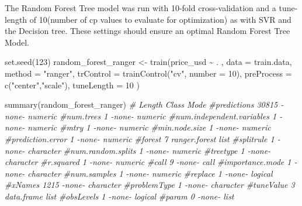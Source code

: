 \documentclass[
]{article}
\newenvironment{Shaded}{\begin{snugshade}}{\end{snugshade}}
\newcommand{\AttributeTok}[1]{\textcolor[rgb]{0.77,0.63,0.00}{#1}}
\newcommand{\CommentTok}[1]{\textcolor[rgb]{0.56,0.35,0.01}{\textit{#1}}}
\newcommand{\DecValTok}[1]{\textcolor[rgb]{0.00,0.00,0.81}{#1}}
\newcommand{\FunctionTok}[1]{\textcolor[rgb]{0.00,0.00,0.00}{#1}}
\newcommand{\NormalTok}[1]{#1}
\newcommand{\OtherTok}[1]{\textcolor[rgb]{0.56,0.35,0.01}{#1}}
\newcommand{\SpecialCharTok}[1]{\textcolor[rgb]{0.00,0.00,0.00}{#1}}
\newcommand{\StringTok}[1]{\textcolor[rgb]{0.31,0.60,0.02}{#1}}
\begin{document}
The Random Forest Tree model was run with 10-fold cross-validation and a
tune-length of 10(number of cp values to evaluate for optimization) as
with SVR and the Decision tree. These settings should ensure an optimal
Random Forest Tree Model.

\begin{Shaded}
\begin{Highlighting}[]
\FunctionTok{set.seed}\NormalTok{(}\DecValTok{123}\NormalTok{)}
\NormalTok{random\_forest\_ranger }\OtherTok{\textless{}{-}} \FunctionTok{train}\NormalTok{(price\_usd }\SpecialCharTok{\textasciitilde{}}\NormalTok{ . ,}
                              \AttributeTok{data =}\NormalTok{ train.data,}
                              \AttributeTok{method =} \StringTok{"ranger"}\NormalTok{,}
                              \AttributeTok{trControl =} \FunctionTok{trainControl}\NormalTok{(}\StringTok{"cv"}\NormalTok{, }\AttributeTok{number =} \DecValTok{10}\NormalTok{),}
                              \AttributeTok{preProcess =} \FunctionTok{c}\NormalTok{(}\StringTok{"center"}\NormalTok{,}\StringTok{"scale"}\NormalTok{),}
                              \AttributeTok{tuneLength =} \DecValTok{10}
\NormalTok{)}

\FunctionTok{summary}\NormalTok{(random\_forest\_ranger)}
\CommentTok{\#                          Length Class         Mode     }
\CommentTok{\#predictions               30815  {-}none{-}        numeric  }
\CommentTok{\#num.trees                     1  {-}none{-}        numeric  }
\CommentTok{\#num.independent.variables     1  {-}none{-}        numeric  }
\CommentTok{\#mtry                          1  {-}none{-}        numeric  }
\CommentTok{\#min.node.size                 1  {-}none{-}        numeric  }
\CommentTok{\#prediction.error              1  {-}none{-}        numeric  }
\CommentTok{\#forest                        7  ranger.forest list     }
\CommentTok{\#splitrule                     1  {-}none{-}        character}
\CommentTok{\#num.random.splits             1  {-}none{-}        numeric  }
\CommentTok{\#treetype                      1  {-}none{-}        character}
\CommentTok{\#r.squared                     1  {-}none{-}        numeric  }
\CommentTok{\#call                          9  {-}none{-}        call     }
\CommentTok{\#importance.mode               1  {-}none{-}        character}
\CommentTok{\#num.samples                   1  {-}none{-}        numeric  }
\CommentTok{\#replace                       1  {-}none{-}        logical  }
\CommentTok{\#xNames                     1215  {-}none{-}        character}
\CommentTok{\#problemType                   1  {-}none{-}        character}
\CommentTok{\#tuneValue                     3  data.frame    list     }
\CommentTok{\#obsLevels                     1  {-}none{-}        logical  }
\CommentTok{\#param                         0  {-}none{-}        list }


\end{Highlighting}
\end{Shaded}
\end{document}
